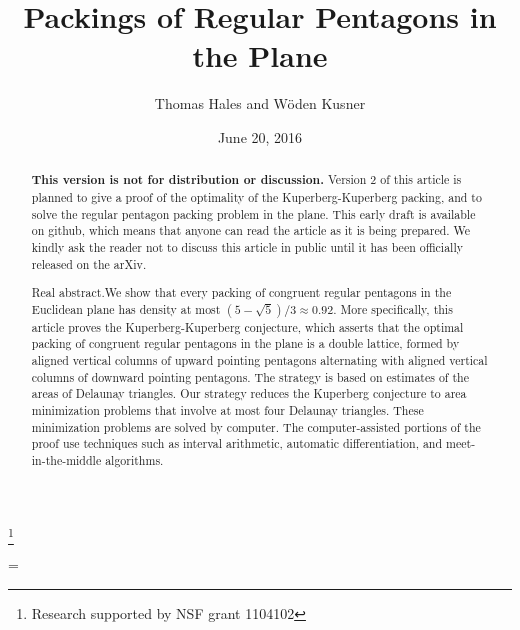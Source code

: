 \documentclass{amsart}
\theoremstyle{plain}
\theoremstyle{definition}
\theoremstyle{remark}
\begin{document}
\title
    {Packings of Regular Pentagons in the Plane}
\author{Thomas Hales and W\"oden Kusner}
\date{June 20, 2016}
\thanks{Research supported by NSF grant 1104102}

\begin{abstract}  
{\bf This version is not for distribution or discussion.}
Version 2 of this article is planned to give a proof of the optimality of the Kuperberg-Kuperberg packing,
and to solve the regular pentagon packing problem in the plane.  This early draft is available on
github, which means that anyone can read the article as it is being prepared.  We kindly ask
the reader not to discuss this article in public until it has been officially released on the arXiv.

{\sc Real abstract.}\quad We show that every packing of congruent regular pentagons in the Euclidean plane has
density at most $(5-\sqrt5)/3\approx 0.92$.     More specifically,
this article proves the Kuperberg-Kuperberg
conjecture, which asserts that the optimal packing of congruent regular pentagons in the plane is a double lattice,
formed by aligned vertical columns of upward pointing pentagons alternating
with aligned vertical columns of downward pointing pentagons.  The strategy is based on estimates
of the areas of Delaunay triangles.  Our strategy reduces the Kuperberg conjecture to
area minimization problems that involve at most four Delaunay triangles.  These minimization problems
are solved by computer.  The computer-assisted portions of the proof use techniques such as
interval arithmetic, automatic differentiation, and meet-in-the-middle algorithms.
\end{abstract}


\parskip=\baselineskip

 \maketitle



    

      
      
       
%
      
      
%





%
\end{document}
